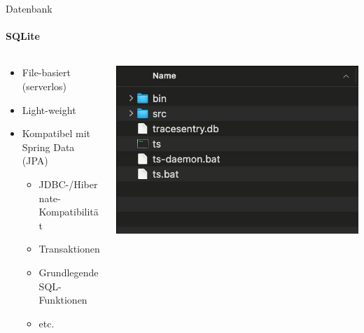 \documentclass[
    ngerman,%
    authorontitle=true,
]{bfhbeamer}
\begin{document}
    \begin{frame}{Datenbank}
        \framesubtitle{SQLite}
        \begin{columns}
            \begin{column}{0.6\textwidth}
                \begin{itemize}
                    \item File-basiert (serverlos)
                    \item Light-weight
                    \item Kompatibel mit Spring Data (JPA)
                    \begin{itemize}
                        \item JDBC-/Hibernate-Kompatibilität
                        \item Transaktionen
                        \item Grundlegende SQL-Funktionen
                        \item etc.
                    \end{itemize}
                \end{itemize}
            \end{column}
            \begin{column}{0.4\textwidth}
                \begin{center}
                    \includegraphics[width=1\textwidth]{assets/presentation/db}
                \end{center}
            \end{column}
        \end{columns}
    \end{frame}
\end{document}
